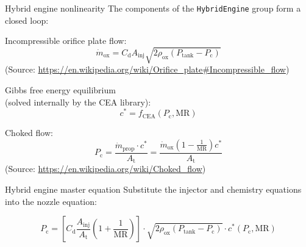 \begin{frame}{Hybrid engine nonlinearity}
  The components of the \lstinline{HybridEngine} group form a closed loop:

  \vspace{\baselineskip}


  \begin{description}[align=right, leftmargin=*, widest=Chemistry]
  \item[Injector] Incompressible orifice plate flow:
    \begin{equation*}
      \dot{m}_\text{ox}
      = C_\text{d} A_\text{inj}
        \sqrt{2\rho_\text{ox} (P_\text{tank} - P_\text{c})}
    \end{equation*}
    {
      \tiny
      (Source:
      \url{https://en.wikipedia.org/wiki/Orifice\_plate\#Incompressible\_flow})
    }
  \item[Chemistry] Gibbs free energy equilibrium \\
    (solved internally by the CEA library):
    \begin{equation*}
      c^* = f_\text{CEA} (P_\text{c}, \mathrm{MR})
    \end{equation*}
  \item[Nozzle] Choked flow:
    \begin{equation*}
      P_\text{c}
      = \frac{\dot{m}_\text{prop} \cdot c^*}{A_\text{t}}
      = \frac{\dot{m}_\text{ox} \left(1 - \frac{1}{\mathrm{MR}}\right)c^*}
             {A_\text{t}}
    \end{equation*}
    {
      \tiny
      (Source: \url{https://en.wikipedia.org/wiki/Choked\_flow})
    }
  \end{description}
\end{frame}

\begin{frame}{Hybrid engine master equation}
  Substitute the injector and chemistry equations into the nozzle equation:

  \vspace{\baselineskip}

  \begin{equation*}
    P_\text{c}
    = \left[
        C_\mathrm{d}
        \frac{A_\text{inj}}{A_\text{t}}
        \left(1 + \frac{1}{\mathrm{MR}}\right)
      \right]
      \cdot \sqrt{2\rho_\text{ox} (P_\text{tank} - P_\text{c})}
      \cdot c^* (P_\text{c}, \mathrm{MR})
  \end{equation*}
\end{frame}

